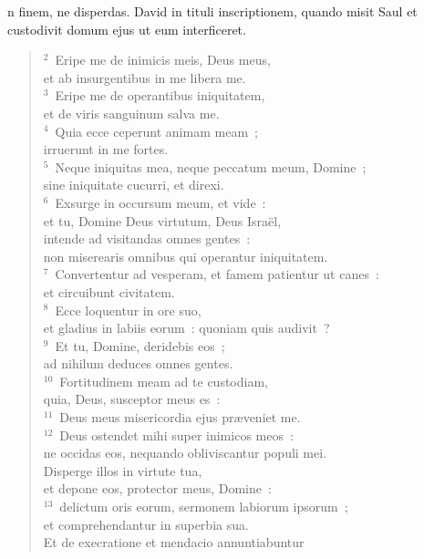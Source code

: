 \bchapter
{}n finem, ne disperdas. David in tituli inscriptionem, quando misit Saul et custodivit domum ejus ut eum interficeret.
\begin{flushleft}\begin{verse}\vspace{6pt}${}^{2}$~Eripe me de inimicis meis, Deus meus,\\ et ab insurgentibus in me libera me.\\
${}^{3}$~Eripe me de operantibus iniquitatem,\\ et de viris sanguinum salva me.\\
${}^{4}$~Quia ecce ceperunt animam meam~;\\ irruerunt in me fortes.\\
${}^{5}$~Neque iniquitas mea, neque peccatum meum, Domine~;\\ sine iniquitate cucurri, et direxi.\\
${}^{6}$~Exsurge in occursum meum, et vide~:\\ et tu, Domine Deus virtutum, Deus Isra\"el,\\ intende ad visitandas omnes gentes~:\\ non miserearis omnibus qui operantur iniquitatem.\\
${}^{7}$~Convertentur ad vesperam, et famem patientur ut canes~:\\ et circuibunt civitatem.\\
${}^{8}$~Ecce loquentur in ore suo,\\ et gladius in labiis eorum~: quoniam quis audivit~?\\
${}^{9}$~Et tu, Domine, deridebis eos~;\\ ad nihilum deduces omnes gentes.\\
${}^{10}$~Fortitudinem meam ad te custodiam,\\ quia, Deus, susceptor meus es~:\\
${}^{11}$~Deus meus misericordia ejus pr\ae veniet me.\\
${}^{12}$~Deus ostendet mihi super inimicos meos~:\\ ne occidas eos, nequando obliviscantur populi mei.\\ Disperge illos in virtute tua,\\ et depone eos, protector meus, Domine~:\\
${}^{13}$~delictum oris eorum, sermonem labiorum ipsorum~;\\ et comprehendantur in superbia sua.\\ Et de execratione et mendacio annuntiabuntur

\end{verse}
\end{flushleft}
